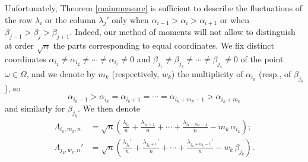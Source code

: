 \documentclass[smallextended,nospthms]{svjour3}
\theoremstyle{remark}
\begin{document}
Unfortunately, Theorem \ref{mainmeasure} is sufficient to describe the fluctuations of the row $\lambda_{i}$ or the column $\lambda_{j}'$ only when $\alpha_{i-1}>\alpha_{i}>\alpha_{i+1}$ or when $\beta_{j-1}>\beta_{j}>\beta_{j+1}$. Indeed, our method of moments will not allow to distinguish at order $\sqrt{n}$ the parts corresponding to equal coordinates. We fix distinct coordinates $\alpha_{i_{1}}\neq \alpha_{i_{2}}\neq \cdots \neq \alpha_{i_{r}}\neq 0$ and $\beta_{j_{1}}\neq \beta_{j_{2}} \neq \cdots \neq \beta_{j_{s}}\neq 0$ of the point $\omega \in \Omega$, and we denote by $m_{k}$ (respectively, $w_{k}$) the multiplicity of $\alpha_{i_{k}}$ (resp., of $\beta_{j_{k}}$), so
$$\alpha_{i_{k}-1}>\alpha_{i_{k}}=\alpha_{i_{k}+1}=\cdots=\alpha_{i_{k}+m_{k}-1}>\alpha_{i_{k}+m_{k}}$$
and similarly for $\beta_{j_{k}}$. We then denote
\begin{align*}\Lambda_{i_{k},m_{k},n}&=\sqrt{n}\left( \frac{\lambda_{i_{k}}}{n}+ \frac{\lambda_{i_{k}+1}}{n}+\cdots+ \frac{\lambda_{i_{k}+m_{k}-1}}{n}-m_{k}\,\alpha_{i_{k}}\right);\\
\Lambda_{j_{k},w_{k},n}'&=\sqrt{n}\left( \frac{\lambda_{j_{k}}'}{n}+ \frac{\lambda_{j_{k}+1}'}{n}+\cdots+ \frac{\lambda_{j_{k}+w_{k}-1}'}{n}-w_{k}\,\beta_{j_{k}}\right).
\end{align*}
\end{document}
